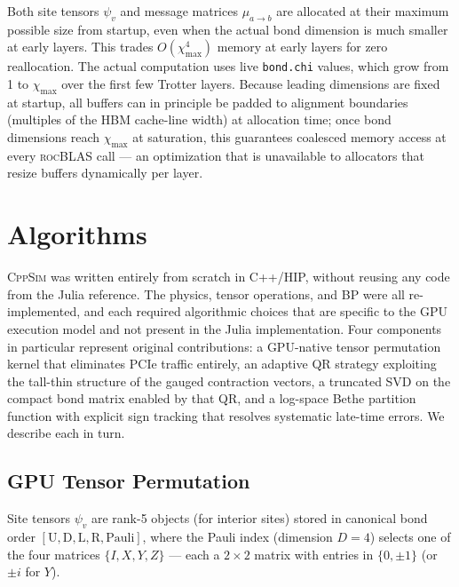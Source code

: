 \documentclass[11pt]{article}
\newcommand{\chimax}{\chi_{\mathrm{max}}}
\begin{document}
Both site tensors $\psi_v$ and message matrices $\mu_{a\to b}$ are allocated at their maximum possible size from
startup, even when the actual bond dimension is much smaller at early layers.
This trades $O(\chimax^4)$ memory at early layers for zero reallocation.
The actual computation uses live \texttt{bond.chi} values, which grow from 1 to
$\chimax$ over the first few Trotter layers.
Because leading dimensions are fixed at startup, all buffers can in principle be
padded to alignment boundaries (multiples of the HBM cache-line width) at
allocation time; once bond dimensions reach $\chimax$ at saturation, this
guarantees coalesced memory access at every \textsc{rocBLAS} call ---
an optimization that is unavailable to allocators that resize buffers
dynamically per layer.

\section{Algorithms}
\label{sec:algorithms}

\textsc{CppSim} was written entirely from scratch in C++/HIP, without reusing
any code from the Julia reference. The physics, tensor operations, and BP
were all re-implemented, and each required algorithmic choices that are specific
to the GPU execution model and not present in the Julia implementation.
Four components in particular represent original contributions: a GPU-native
tensor permutation kernel that eliminates PCIe traffic entirely, an adaptive
QR strategy exploiting the tall-thin structure of the gauged contraction vectors,
a truncated SVD on the compact bond matrix enabled by that QR, and a
log-space Bethe partition function with explicit sign tracking that resolves
systematic late-time errors. We describe each in turn.

\subsection{GPU Tensor Permutation}
\label{sec:permute}

Site tensors $\psi_v$ are rank-5 objects (for interior sites) stored in canonical
bond order $[\text{U}, \text{D}, \text{L}, \text{R}, \text{Pauli}]$,
where the Pauli index (dimension $D=4$) selects one of the four matrices
$\{I, X, Y, Z\}$ — each a $2\times2$ matrix with entries in $\{0, \pm1\}$ (or
$\pm i$ for $Y$).
\end{document}
